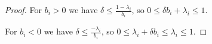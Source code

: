 %
\begin{proof}
For $b_i>0$ we have $\delta \le \frac{1-\lambda_i}{b_i}$, so $0 \le\delta b_i + \lambda_i\le 1$.

For $b_i<0$ we have $\delta \le \frac{-\lambda_i}{b_i}$, so $0\le\lambda_i+\delta b_i \le \lambda_i\le 1$.
\end{proof}
%




\printbibliography[title=References Section~\thesection]

